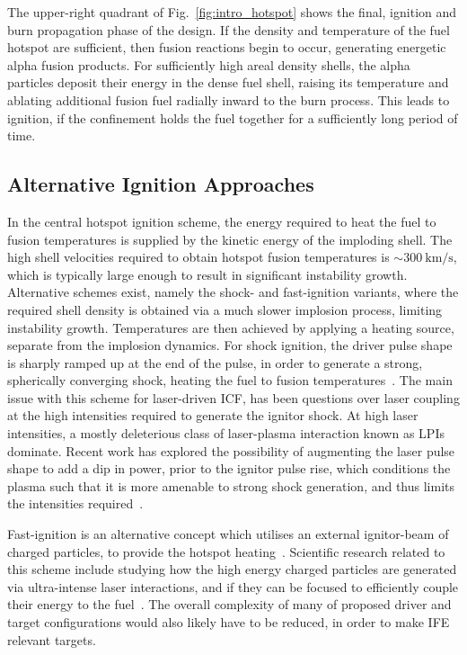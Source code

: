 The upper-right quadrant of Fig.~\ref{fig:intro_hotspot} shows the final, ignition and burn propagation phase of the design.
If the density and temperature of the fuel hotspot are sufficient, then fusion reactions begin to occur, generating energetic alpha fusion products.
For sufficiently high areal density shells, the alpha particles deposit their energy in the dense fuel shell, raising its temperature and ablating additional fusion fuel radially inward to the burn process.
This leads to ignition, if the confinement holds the fuel together for a sufficiently long period of time.

\subsection{Alternative Ignition Approaches}%
\label{sec:intro_icf_alt}

In the central hotspot ignition scheme, the energy required to heat the fuel to fusion temperatures is supplied by the kinetic energy of the imploding shell.
The high shell velocities required to obtain hotspot fusion temperatures is $\sim300\ \text{km/s}$, which is typically large enough to result in significant instability growth.
Alternative schemes exist, namely the shock- and fast-ignition variants, where the required shell density is obtained via a much slower implosion process, limiting instability growth.
Temperatures are then achieved by applying a heating source, separate from the implosion dynamics.
For shock ignition, the driver pulse shape is sharply ramped up at the end of the pulse, in order to generate a strong, spherically converging shock, heating the fuel to fusion temperatures~\cite{betti_shock_2007,perkins_shock_2009}.
The main issue with this scheme for laser-driven \ac{ICF}, has been questions over laser coupling at the high intensities required to generate the ignitor shock.
At high laser intensities, a mostly deleterious class of laser-plasma interaction known as \ac{LPIs} dominate.
Recent work has explored the possibility of augmenting the laser pulse shape to add a dip in power, prior to the ignitor pulse rise, which conditions the plasma such that it is more amenable to strong shock generation, and thus limits the intensities required~\cite{scott_shockaugmented_2022}.

Fast-ignition is an alternative concept which utilises an external ignitor-beam of charged particles, to provide the hotspot heating~\cite{tabak_ignition_1994}.
Scientific research related to this scheme include studying how the high energy charged particles are generated via ultra-intense laser interactions, and if they can be focused to efficiently couple their energy to the fuel~\cite{jarrott_visualizing_2016,gong_direct_2019}.
The overall complexity of many of proposed driver and target configurations would also likely have to be reduced, in order to make \ac{IFE} relevant targets.

